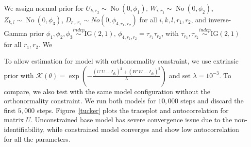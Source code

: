 \documentclass[10pt,fleqn]{article}
\newcommand{\mc}[1]{\mathcal{#1}}
\DeclareMathOperator{\No}{No}
\DeclareMathOperator{\1}{\mathbbm{1}}
\begin{document}
   We assign normal prior for $U_{k,r_2}\sim \No(0,\phi_{1})$, $W_{i,r_1}\sim \No(0,\phi_2)$, $Z_{k,l}\sim \No(0,\phi_3)$, $D_{r_1,r_2}\sim No(0, \phi_{4,r_1,r_2})$ for all $i,k,l,r_1,r_2$, and inverse-Gamma prior $\phi_1,\phi_2,\phi_3\stackrel{indep}{\sim} \text{IG}(2,1)$, $\phi_{4,r_1,r_2}= \tau_{r_1}\tau_{r_2}$, with $\tau_{r_1},\tau_{r_2}\stackrel{indep}{\sim} \text{IG}(2,1)$ for all $r_1,r_2$. We


To allow estimation for model with orthonormality constraint, we use extrinsic prior with $\mc K(\theta) = \exp( - \frac{(U'U-I_{d_1})^2 + (W'W-I_{d_2})^2  }{\lambda})$ and set $\lambda=10^{-3}$. To compare, we also test with the same model configuration without the orthonormality constraint. We run both models for $10,000$ steps and discard the first $5,000$ steps. Figure~\ref{tucker} plots the traceplot and autocorrelation for matrix $U$. Unconstrained base model has severe convergence issue due to the non-identifiability, while constrained model converges and show low autocorrelation for all the parameters.
\end{document}
